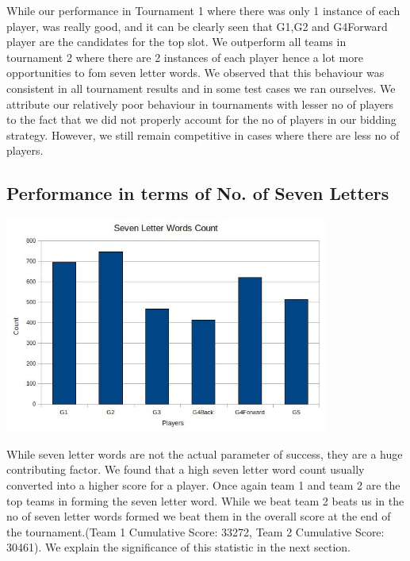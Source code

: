 \documentclass[11pt]{article}
\begin{document}
	While our performance in Tournament 1 where there was only 1 instance of each player, was really good, and it can be clearly seen that G1,G2 and G4Forward player are the candidates for the top slot. We outperform all teams in tournament 2 where there are 2 instances of each player hence a lot more opportunities to fom seven letter words. We observed that this behaviour was consistent in all tournament results and in some test cases we ran ourselves. We attribute our relatively poor behaviour in tournaments with lesser no of players to the fact that we did not properly account for the no of players in our bidding strategy. However, we still remain competitive in cases where there are less no of players.
	
	\subsection{Performance in terms of No. of Seven Letters}
	
	\includegraphics[width=0.8\textwidth]{SevenCount}
	
	While seven letter words are not the actual parameter of success, they are a huge contributing factor. We found that a high seven letter word count usually converted into a higher score for a player. Once again team 1 and team 2 are the top teams in forming the seven letter word. While we beat team 2 beats us in the no of seven letter words formed we beat them in the overall score at the end of the tournament.(Team 1 Cumulative Score: 33272, Team 2 Cumulative Score: 30461). We explain the significance of this statistic in the next section.
\end{document}
